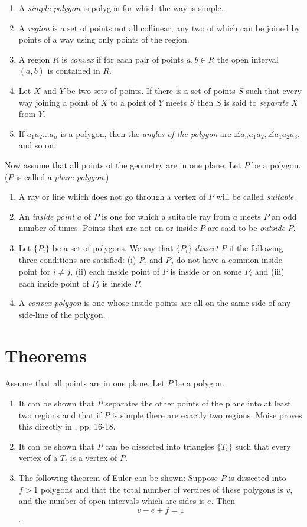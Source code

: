 \documentclass{article}
\begin{document}
\begin{enumerate}
\item A \emph{simple polygon} is polygon for which the way is simple.
\item A \emph{region} is a set of points not all collinear, any two of which can be joined by points of a way using
only points of the region. 
\item A region $R$ is \emph{convex} if for each pair of points $a,b \in R$  the open interval $(a,b)$ is 
contained in $R.$
\item Let $X$ and $Y$ be two sets of points. If there is a set of points $S$ such that every way 
joining a point of $X$ to a point of $Y$ meets $S$ then $S$ is said to \emph{separate}
$X$ from $Y$. 
\item If $a_1 a_2 \ldots a_n$ is a polygon, then the \emph{angles of the polygon} are
$\angle a_na_1a_2, \angle a_1a_2a_3$, and so on. 
\end{enumerate}

Now assume that all points of the geometry are in one plane. Let $P$ be a polygon. ($P$ is called
a \emph{plane polygon}.)
\begin{enumerate} 
\item A ray or line which does not go through a vertex of $P$ will be called \emph{suitable}.
\item An  \emph{inside point} $a$ of $P$ is one for which a  suitable ray from $a$
meets $P$ an odd number of times. Points that are not on or inside $P$ are said to be \emph{outside} 
$P$. 
\item Let $\{P_i\}$ be a set of polygons. We say that $\{P_i\}$ \emph{dissect} $P$ if the following
three conditions are satisfied: (i) $P_i$ and $P_j$ do not have a common inside point for $i \not = j$,
(ii) each inside point of $P$ is inside or on some $P_i$ and (iii) each inside point of $P_i$ is
inside $P$.
\item A \emph{convex polygon} is one whose inside points are all on the same side of any side-line 
of the polygon. 
\end{enumerate}

\section{Theorems}
Assume that all points are in one plane. Let $P$ be a polygon.
\begin{enumerate}
\item It can be shown that $P$ separates the other points of the plane into at least two regions and that
if $P$ is simple there are exactly two regions. Moise proves this directly in \cite{moise}, pp. 16-18.
\item It can be shown that $P$ can be dissected into triangles $\{T_i\}$ such that 
every vertex of a $T_i$ is a vertex of $P$. 
\item The following theorem of Euler can be shown: Suppose  $P$ is dissected into $f>1$ polygons
and that the total number of vertices of these polygons is $v$, and the number of open intervals
which are sides is $e$. Then 
$$
v-e+f = 1
$$.
\end{enumerate}
 
\end{document}
